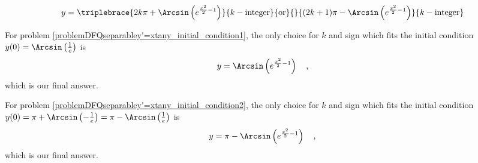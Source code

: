 {\[
y=\triplebrace{ 2 k \pi+\Arcsin\left( e^{\frac{x^2}{2}-1} \right)}{k -\text{integer}}{\text{or}}{}{(2k+1)\pi- \Arcsin\left( e^{\frac{x^2}{2}-1} \right)}{k-\text{integer}}
\]

For problem \ref{problemDFQseparabley'=xtany_initial_condition1}, 
the only choice for $k$ and sign which fits the initial condition $y(0)= \Arcsin\left(\frac{1}{e}\right)$ is
\[
y=\Arcsin\left(e^{\frac{x^2}{2}-1} \right)\quad ,
\]
which is our final answer. 

For problem \ref{problemDFQseparabley'=xtany_initial_condition2}, 
the only choice for $k$ and sign which fits the initial condition $y(0)=\pi+ \Arcsin\left(-\frac{1}{e}\right)=\pi- \Arcsin \left( \frac{1}{e}\right) $ is
\[
y=\pi- \Arcsin\left(e^{\frac{x^2}{2}-1} \right)\quad, 
\]
which is our final answer.
}